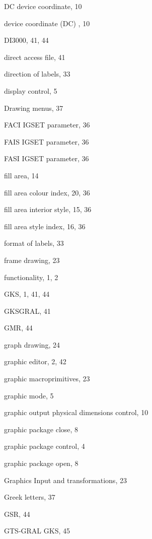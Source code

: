 \begin{theindex}
  \indexspace
 
  \item DC
    \subitem device coordinate, 10
  \item device coordinate (DC) , 10
  \item DI3000, 41, 44
  \item direct access file, 41
  \item direction of labels, 33
  \item display control, 5
  \item Drawing menus, 37
 
  \indexspace
 
  \item FACI
    \subitem IGSET parameter, 36
  \item FAIS
    \subitem IGSET parameter, 36
  \item FASI
    \subitem IGSET parameter, 36
  \item fill area, 14
  \item fill area colour index, 20, 36
  \item fill area interior style, 15, 36
  \item fill area style index, 16, 36
  \item format of labels, 33
  \item frame drawing, 23
  \item functionality, 1, 2
 
  \indexspace
 
  \item GKS, 1, 41, 44
  \item GKSGRAL, 41
  \item GMR, 44
  \item graph drawing, 24
  \item graphic editor, 2, 42
  \item graphic macroprimitives, 23
  \item graphic mode, 5
  \item graphic output physical dimensions control, 10
  \item graphic package close, 8
  \item graphic package control, 4
  \item graphic package open, 8
  \item Graphics Input and transformations, 23
  \item Greek letters, 37
  \item GSR, 44
  \item GTS-GRAL GKS, 45
 

\end{theindex}
